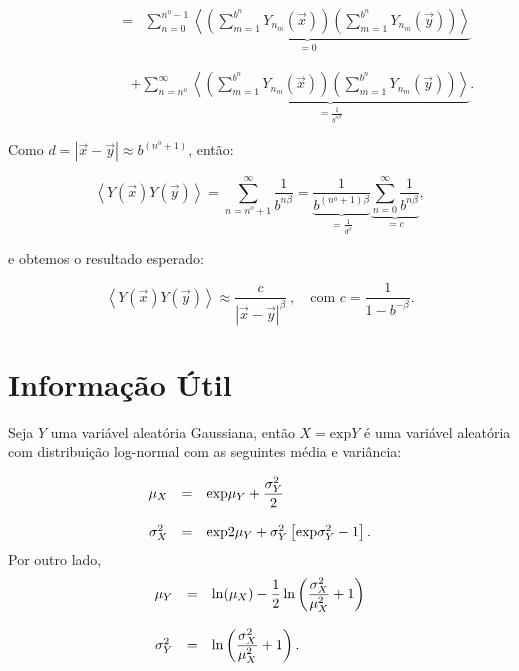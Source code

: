 \documentclass[12pt,a4paper,portuges]{article}
\newcommand{\Y}{{Y}}
\renewcommand{\exp}{\mbox{exp}}
\begin{document}
\begin{eqnarray*}
\qquad \qquad \ \	&=& \displaystyle
	\underbrace{\sum^{n^o-1}_{n=0}
	\left\langle \left( \sum^{b^n}_{m=1} {\Y}_{n_m}(\vec{x})
	 \right) \left( \sum^{b^{n}}_{m=1}
	{\Y}_{n_m}(\vec{y}) \right) \right\rangle}_{=0}
\end{eqnarray*}

\begin{eqnarray*}
\qquad \qquad \ \	& & + \displaystyle
	\sum^\infty_{n=n^o}\underbrace{
	\left\langle \left( \sum^{b^n}_{m=1} {\Y}_{n_m}(\vec{x})
	 \right) \left( \sum^{b^{n}}_{m=1}
	{\Y}_{n_m}(\vec{y}) \right) \right\rangle}_{=\frac{1}{b^{n \beta}}}.
\end{eqnarray*}

\noindent Como $d= |\vec{x} - \vec{y}| \approx b^{(n^o + 1)}$, então:

\[
	\left\langle \Y(\vec{x}) \Y(\vec{y}) \right\rangle =
	 \sum^\infty_{n=n^o + 1} \frac{1}{b^{n \beta}}=
	\underbrace{\frac{1}{b^{(n^o+1)\beta}}}_{=\frac{1}{d^\beta}}
	\underbrace{\sum^\infty_{n=0} \frac{1}{b^{n \beta}}}_{=c},
\]

\noindent e obtemos o resultado esperado:

\[
	\left\langle \Y(\vec{x}) \Y(\vec{y}) \right\rangle \approx
	\frac{c}{| \vec{x}-\vec{y}|^\beta} \ ,
	\quad \mbox{com  } c =\displaystyle \frac{1}{1-b^{-\beta}}.
\]
\section{Informação Útil}

Seja $Y$ uma variável aleatória Gaussiana, então $X=\exp{Y}$ é uma variável aleatória com distribuição log-normal com as seguintes média e variância:

\begin{equation}
  \begin{array}{rcl}
    \mu_{X}   &=&\exp{\mu_{Y}+\displaystyle\frac{\vari{Y}}{2}}\\ \\
    \vari{X} &=&\exp{2\mu_{Y}+\vari{Y}}\left[\exp{\vari{Y}}-1\right].
  \end{array}
\end{equation}
\noindent Por outro lado,
\begin{equation}
  \begin{array}{rcl}
    \mu_{Y}   &=&\ln(\mu_{X})-\displaystyle\frac{1}{2}\ln
    \left(\frac{{\sigma_{X}^{2}}}{\mu_{X}^2}+1\right)\\ \\
    {\sigma_{Y}^{2}} &=&\ln\left(\displaystyle\frac{{\sigma_{X}^{2}}}{\mu_{X}^2}+1\right).
  \end{array}
\end{equation}
\end{document}

